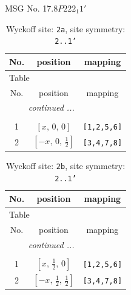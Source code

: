\documentclass[fleqn,8pt]{jsarticle}
\begin{document}
\setcounter{MaxMatrixCols}{32}

\renewcommand{\tablename}{Table~}
\renewcommand{\figurename}{Figure~}
\begin{center}
\LARGE
MSG No. 17.8\quad$P222_{1}1'$
\end{center}
\renewcommand{\arraystretch}{1.2}
\begin{longtable}{ccc}
\caption{Wyckoff site: {\tt 2a}, site symmetry: {\tt 2..1'}}
 \\
 \hline \hline
No. & position & mapping \\ \hline \endfirsthead

\multicolumn{2}{l}{\tablename\ \thetable{}} \\
 \hline \hline
No. & position & mapping \\ \hline \endhead

 \hline \hline
\multicolumn{2}{r}{\footnotesize\it continued ...} \\ \endfoot

 \hline \hline
\multicolumn{2}{r}{} \\ \endlastfoot

1 & $\left[ x,\, 0,\, 0 \right]$ & {\tt [1,2,5,6]} \\ \hline
2 & $\left[ - x,\, 0,\, \frac{1}{2} \right]$ & {\tt [3,4,7,8]} \\
\end{longtable}
\renewcommand{\arraystretch}{1.2}
\begin{longtable}{ccc}
\caption{Wyckoff site: {\tt 2b}, site symmetry: {\tt 2..1'}}
 \\
 \hline \hline
No. & position & mapping \\ \hline \endfirsthead

\multicolumn{2}{l}{\tablename\ \thetable{}} \\
 \hline \hline
No. & position & mapping \\ \hline \endhead

 \hline \hline
\multicolumn{2}{r}{\footnotesize\it continued ...} \\ \endfoot

 \hline \hline
\multicolumn{2}{r}{} \\ \endlastfoot

1 & $\left[ x,\, \frac{1}{2},\, 0 \right]$ & {\tt [1,2,5,6]} \\ \hline
2 & $\left[ - x,\, \frac{1}{2},\, \frac{1}{2} \right]$ & {\tt [3,4,7,8]} \\
\end{longtable}
\renewcommand{\arraystretch}{1.2}
\end{document}
